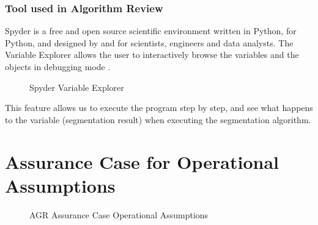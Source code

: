\subsubsection{Tool used in Algorithm Review}

Spyder is a free and open source scientific environment written in Python, for Python, and designed by and for scientists, engineers and data analysts. The Variable Explorer allows the user to interactively browse the variables and the objects in debugging mode \cite{raybaut2009spyder}.
\begin{figure}[H]
    \centering
    \caption[Spyder Variable Explorer]{Spyder Variable Explorer \cite{raybaut2009spyder}}
    \label{fig_spyder_ve}
\end{figure}

This feature allows us to execute the program step by step, and see what happens to the variable (segmentation result) when executing the segmentation algorithm. 



\section{Assurance Case for Operational Assumptions}

\begin{figure}[H]
    \centering
    \caption[AGR Assurance Case Operational Assumptions]{AGR Assurance Case Operational Assumptions}
    \label{fig_agr_ac_gba}
\end{figure}

